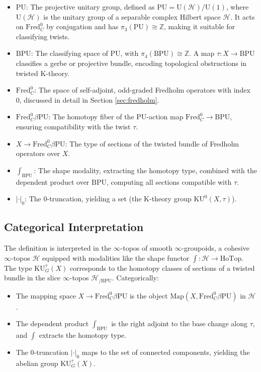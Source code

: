 \documentclass{article}
\theoremstyle{definition}
\begin{document}
\begin{itemize}
    \item \textbf{\(\mathrm{PU}\)}: The projective unitary group, defined as \(\mathrm{PU} = \mathrm{U}(\mathscr{H}) / \mathrm{U}(1)\), where \(\mathrm{U}(\mathscr{H})\) is the unitary group of a separable complex Hilbert space \(\mathscr{H}\). It acts on \(\text{Fred}_C^0\) by conjugation and has \(\pi_3(\mathrm{PU}) \cong \mathbb{Z}\), making it suitable for classifying twists.
    \item \textbf{\(\mathrm{BPU}\)}: The classifying space of \(\mathrm{PU}\), with \(\pi_4(\mathrm{BPU}) \cong \mathbb{Z}\). A map \(\tau: X \to \mathrm{BPU}\) classifies a gerbe or projective bundle, encoding topological obstructions in twisted K-theory.
    \item \textbf{\(\text{Fred}_C^0\)}: The space of self-adjoint, odd-graded Fredholm operators with index 0, discussed in detail in Section \ref{sec:fredholm}.
    \item \textbf{\(\text{Fred}_C^0 \beta \mathrm{PU}\)}: The homotopy fiber of the \(\mathrm{PU}\)-action map \(\text{Fred}_C^0 \to \mathrm{BPU}\), ensuring compatibility with the twist \(\tau\).
    \item \textbf{\(X \to \text{Fred}_C^0 \beta \mathrm{PU}\)}: The type of sections of the twisted bundle of Fredholm operators over \(X\).
    \item \textbf{\(\int_{\mathrm{BPU}}\)}: The shape modality, extracting the homotopy type, combined with the dependent product over \(\mathrm{BPU}\), computing all sections compatible with \(\tau\).
    \item \textbf{\(|\cdot|_0\)}: The 0-truncation, yielding a set (the K-theory group \(\mathrm{KU}^0(X, \tau)\)).
\end{itemize}

\subsection{Categorical Interpretation}

The definition is interpreted in the \(\infty\)-topos of smooth \(\infty\)-groupoids, a cohesive \(\infty\)-topos \(\mathcal{H}\) equipped with modalities like the shape functor \(\int: \mathcal{H} \to \text{HoTop}\). The type \(\mathrm{KU}^\tau_G(X)\) corresponds to the homotopy classes of sections of a twisted bundle in the slice \(\infty\)-topos \(\mathcal{H}_{/\mathrm{BPU}}\). Categorically:

\begin{itemize}
    \item The mapping space \(X \to \text{Fred}_C^0 \beta \mathrm{PU}\) is the object \(\text{Map}(X, \text{Fred}_C^0 \beta \mathrm{PU})\) in \(\mathcal{H}\).
    \item The dependent product \(\int_{\mathrm{BPU}}\) is the right adjoint to the base change along \(\tau\), and \(\int\) extracts the homotopy type.
    \item The 0-truncation \(|\cdot|_0\) maps to the set of connected components, yielding the abelian group \(\mathrm{KU}^\tau_G(X)\).
\end{itemize}
\end{document}
